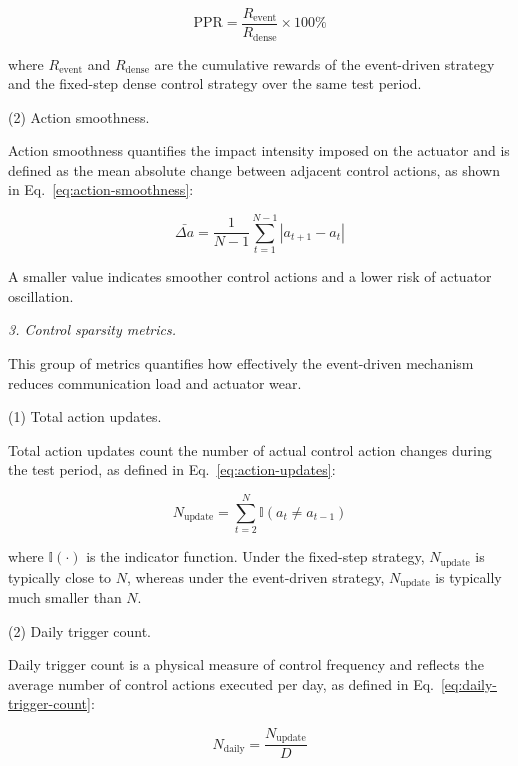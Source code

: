 \documentclass[preprint,12pt,number]{elsarticle}
\begin{document}
\[
\mathrm{PPR} = \frac{R_{\text{event}}}{R_{\text{dense}}} \times 100\% \tag{28}\label{eq:ppr}
\]

\noindent where \(R_{\text{event}}\) and \(R_{\text{dense}}\) are the cumulative rewards of the event-driven strategy and the fixed-step dense control strategy over the same test period.

\par\smallskip
\noindent (2) Action smoothness.
\par\nobreak Action smoothness quantifies the impact intensity imposed on the actuator and is defined as the mean absolute change between adjacent control actions, as shown in Eq.~\eqref{eq:action-smoothness}:

\[
\bar{\Delta a} = \frac{1}{N-1} \sum_{t=1}^{N-1} |a_{t+1} - a_t| \tag{29}\label{eq:action-smoothness}
\]

A smaller value indicates smoother control actions and a lower risk of actuator oscillation.

\par\medskip
\noindent\textit{3. Control sparsity metrics.}\label{control-sparsity-metrics}
\par\smallskip

This group of metrics quantifies how effectively the event-driven mechanism reduces communication load and actuator wear.

\par\smallskip
\noindent (1) Total action updates.
\par\nobreak Total action updates count the number of actual control action changes during the test period, as defined in Eq.~\eqref{eq:action-updates}:

\[
N_{\text{update}} = \sum_{t=2}^{N} \mathbb{I}(a_t \neq a_{t-1}) \tag{30}\label{eq:action-updates}
\]

\noindent where \(\mathbb{I}(\cdot)\) is the indicator function. Under the fixed-step strategy, \(N_{\text{update}}\) is typically close to \(N\), whereas under the event-driven strategy, \(N_{\text{update}}\) is typically much smaller than \(N\).

\par\smallskip
\noindent (2) Daily trigger count.
\par\nobreak Daily trigger count is a physical measure of control frequency and reflects the average number of control actions executed per day, as defined in Eq.~\eqref{eq:daily-trigger-count}:

\[
N_{\text{daily}} = \frac{N_{\text{update}}}{D} \tag{31}\label{eq:daily-trigger-count}
\]
\end{document}
